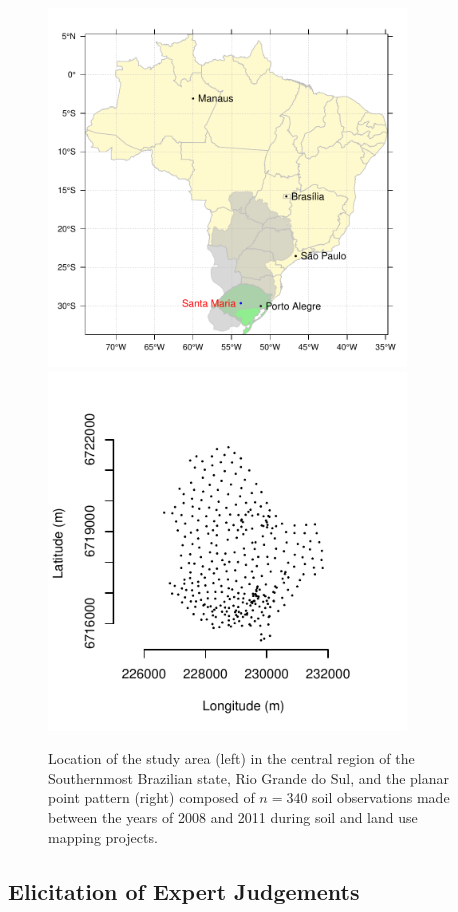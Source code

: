 \begin{figure}[!ht]
 \centering
 \includegraphics[width=95mm]{fig/chap02-location}
 \includegraphics[width=95mm]{fig/chap06-ppp}
 \caption{Location of the study area (left) in the central region of the Southernmost Brazilian state, Rio 
 Grande do Sul, and the planar point pattern (right) composed of $n = 340$ soil observations made between 
 the years of \num{2008} and \num{2011} during soil and land use mapping projects.}
 \label{fig:chap06-chap06-location}
\end{figure}

\subsection{Elicitation of Expert Judgements}

